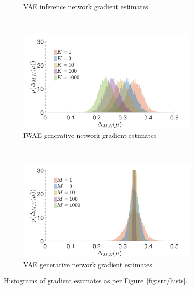 \begin{figure}[h]
\begin{subfigure}[b]{0.45\textwidth}
		\caption{\gls{VAE} inference network gradient estimates \label{fig:hv/b_hist_vae}}
	\end{subfigure}\\
	\begin{subfigure}[b]{0.45\textwidth}
		\centering
		\includegraphics[width=\textwidth]{figures/tighter_bounds/hv_mu_hist_IWAE}
		\caption{\gls{IWAE} generative network gradient estimates \label{fig:hv/mu_hist_iwae}}
	\end{subfigure} ~~~~~~~~~~
	\begin{subfigure}[b]{0.45\textwidth}
		\centering
		\includegraphics[width=\textwidth]{figures/tighter_bounds/hv_mu_hist_VAE}
		\caption{\gls{VAE} generative network gradient estimates \label{fig:hv/mu_hist_vae}}
	\end{subfigure}
	\caption{Histograms of gradient estimates as per Figure~\ref{fig:snr/hists}.
		\label{fig:hv/hists}
	\vspace{-4pt}}
\end{figure}

